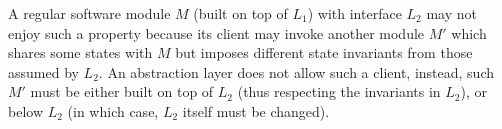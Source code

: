 
A regular software module $M$ (built on top of $L_1$) with interface
$L_2$ may not enjoy such a property because its client may invoke
another module $M'$ which shares some states with $M$ but imposes
different state invariants from those assumed by $L_2$. An abstraction
layer does not allow such a client, instead, such $M'$ must be either built
on top of $L_2$ (thus respecting the invariants in $L_2$), or below
$L_2$ (in which case, $L_2$ itself must be changed).

%
%

